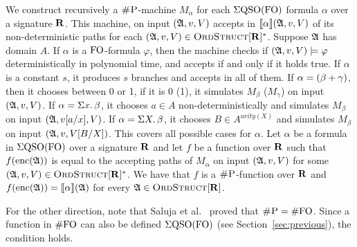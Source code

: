 We construct recursively a $\text{\sc \#P}$-machine $M_{\alpha}$ for each $\Sigma{\rm QSO}({\rm FO})$ formula $\alpha$ over a signature $\mathbf{R}$. This machine, on input $(\mathfrak{A},v,V)$ accepts in ${\llbracket{}{\alpha}\rrbracket}(\mathfrak{A},v,V)$ of its non-deterministic paths for each $(\mathfrak{A},v,V) \in \text{\sc OrdStruct}[\mathbf{R}]^*$. Suppose $\mathfrak{A}$ has domain $A$. If $\alpha$ is a ${\rm FO}$-formula $\varphi$, then the machine checks if $(\mathfrak{A},v,V)\models\varphi$ deterministically in polynomial time, and accepts if and only if it holds true. If $\alpha$ is a constant $s$, it produces $s$ branches and accepts in all of them. If $\alpha = (\beta + \gamma)$, then it chooses between 0 or 1, if it is 0 (1), it simulates $M_{\beta}$ ($M_{\gamma}$) on input $(\mathfrak{A},v,V)$. 
If $\alpha = \Sigma{x}.\,\beta$, it chooses $a\in A$ non-deterministically and simulates $M_{\beta}$ on input $(\mathfrak{A},v[a/x],V)$.
If $\alpha = \Sigma{X}.\,\beta$, it chooses $B\in A^{arity(X)}$ and simulates $M_{\beta}$ on input $(\mathfrak{A},v,V[B/X])$. This covers all possible cases for $\alpha$. Let $\alpha$ be a formula in $\Sigma{\rm QSO}({\rm FO})$ over a signature $\mathbf{R}$ and let $f$ be a function over $\mathbf{R}$ such that $f({\rm enc}(\mathfrak{A}))$ is equal to the accepting paths of $M_{\alpha}$ on input $(\mathfrak{A},v,V)$ for some $(\mathfrak{A},v,V) \in \text{\sc OrdStruct}[\mathbf{R}]^*$. We have that $f$ is a $\text{\sc \#P}$-function over $\mathbf{R}$ and $f({\rm enc}(\mathfrak{A})) = {\llbracket{}{\alpha}\rrbracket}(\mathfrak{A})$ for every $\mathfrak{A}\in\text{\sc OrdStruct}[\mathbf{R}]$.

For the other direction, note that Saluja et al.~\cite{SalujaST95} proved that $\text{\sc \#P} = \#{\rm FO}$. 
Since a function in $\#{\rm FO}$ can also be defined $\Sigma{\rm QSO}({\rm FO})$ (see Section~\ref{sec:previous}), the condition holds.